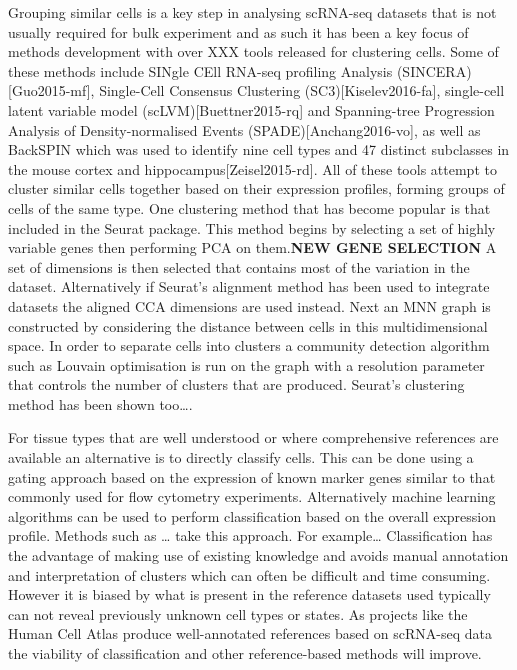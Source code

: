 \documentclass[11pt,a4paper,titlepage,twoside,openright]{style/unimelbthesis}
\theoremstyle{definition}
\theoremstyle{definition}
\theoremstyle{definition}
\theoremstyle{remark}
\begin{document}
\begin{mainmatter}
Grouping similar cells is a key step in analysing scRNA-seq datasets that is not usually required for bulk experiment and as such it has been a key focus of methods development with over XXX tools released for clustering cells. Some of these methods include SINgle CEll RNA-seq profiling Analysis (SINCERA){[}Guo2015-mf{]}, Single-Cell Consensus Clustering (SC3){[}Kiselev2016-fa{]}, single-cell latent variable model (scLVM){[}Buettner2015-rq{]} and Spanning-tree Progression Analysis of Density-normalised Events (SPADE){[}Anchang2016-vo{]}, as well as BackSPIN which was used to identify nine cell types and 47 distinct subclasses in the mouse cortex and hippocampus{[}Zeisel2015-rd{]}. All of these tools attempt to cluster similar cells together based on their expression profiles, forming groups of cells of the same type. One clustering method that has become popular is that included in the Seurat package. This method begins by selecting a set of highly variable genes then performing PCA on them.\textbf{NEW GENE SELECTION} A set of dimensions is then selected that contains most of the variation in the dataset. Alternatively if Seurat's alignment method has been used to integrate datasets the aligned CCA dimensions are used instead. Next an MNN graph is constructed by considering the distance between cells in this multidimensional space. In order to separate cells into clusters a community detection algorithm such as Louvain optimisation is run on the graph with a resolution parameter that controls the number of clusters that are produced. Seurat's clustering method has been shown too\ldots{}.

For tissue types that are well understood or where comprehensive references are available an alternative is to directly classify cells. This can be done using a gating approach based on the expression of known marker genes similar to that commonly used for flow cytometry experiments. Alternatively machine learning algorithms can be used to perform classification based on the overall expression profile. Methods such as \ldots{} take this approach. For example\ldots{} Classification has the advantage of making use of existing knowledge and avoids manual annotation and interpretation of clusters which can often be difficult and time consuming. However it is biased by what is present in the reference datasets used typically can not reveal previously unknown cell types or states. As projects like the Human Cell Atlas produce well-annotated references based on scRNA-seq data the viability of classification and other reference-based methods will improve.


\end{mainmatter}
\end{document}
